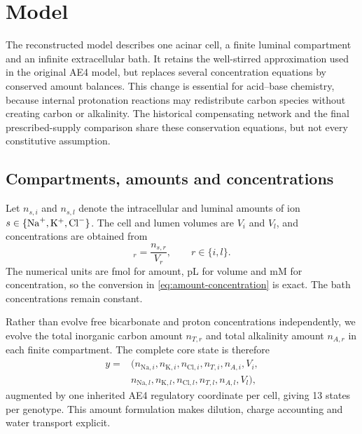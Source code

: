 \section{Model}
\label{sec:model}

The reconstructed model describes one acinar cell, a finite luminal compartment and an infinite extracellular bath. It retains the well-stirred approximation used in the original AE4 model, but replaces several concentration equations by conserved amount balances. This change is essential for acid--base chemistry, because internal protonation reactions may redistribute carbon species without creating carbon or alkalinity. The historical compensating network and the final prescribed-supply comparison share these conservation equations, but not every constitutive assumption.

\subsection{Compartments, amounts and concentrations}

Let $n_{s,i}$ and $n_{s,l}$ denote the intracellular and luminal amounts of ion $s\in\{\mathrm{Na}^{+},\mathrm{K}^{+},\mathrm{Cl}^{-}\}$. The cell and lumen volumes are $V_i$ and $V_l$, and concentrations are obtained from
\begin{equation}
    [s]_r=\frac{n_{s,r}}{V_r}, \qquad r\in\{i,l\}.
    \label{eq:amount-concentration}
\end{equation}
The numerical units are fmol for amount, pL for volume and mM for concentration, so the conversion in \cref{eq:amount-concentration} is exact. The bath concentrations remain constant.

Rather than evolve free bicarbonate and proton concentrations independently, we evolve the total inorganic carbon amount $n_{T,r}$ and total alkalinity amount $n_{A,r}$ in each finite compartment. The complete core state is therefore
\begin{equation}
\begin{aligned}
    y={}&(n_{\mathrm{Na},i},n_{\mathrm{K},i},n_{\mathrm{Cl},i},n_{T,i},n_{A,i},V_i,\\
       &n_{\mathrm{Na},l},n_{\mathrm{K},l},n_{\mathrm{Cl},l},n_{T,l},n_{A,l},V_l),
\end{aligned}
\label{eq:state-vector}
\end{equation}
augmented by one inherited AE4 regulatory coordinate per cell, giving 13 states per genotype. This amount formulation makes dilution, charge accounting and water transport explicit.

